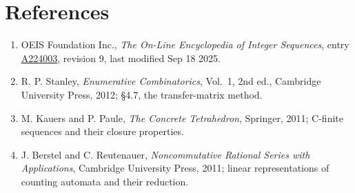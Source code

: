 \documentclass[11pt]{article}
\theoremstyle{definition}
\begin{document}
\section{References}

\begin{enumerate}

\item OEIS Foundation Inc., \emph{The On-Line Encyclopedia of Integer Sequences}, entry \href{https://oeis.org/A224003}{A224003}, revision 9, last modified Sep 18 2025.

\item R. P. Stanley, \emph{Enumerative Combinatorics}, Vol.~1, 2nd ed., Cambridge University Press, 2012; \S4.7, the transfer-matrix method.

\item M. Kauers and P. Paule, \emph{The Concrete Tetrahedron}, Springer, 2011; C-finite sequences and their closure properties.

\item J. Berstel and C. Reutenauer, \emph{Noncommutative Rational Series with Applications}, Cambridge University Press, 2011; linear representations of counting automata and their reduction.

\end{enumerate}
\end{document}
